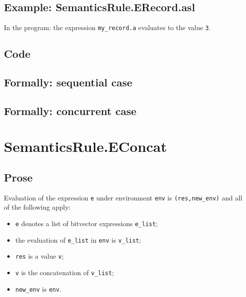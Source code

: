 \documentclass{book}
\begin{document}
  \subsection{Example: SemanticsRule.ERecord.asl}
    In the program:
    the expression \texttt{my\_record.a} evaluates to the value \texttt{3}.

  \subsection{Code}

\begin{emptyformal}
  \subsection{Formally: sequential case}

  \subsection{Formally: concurrent case}
\end{emptyformal}



\section{SemanticsRule.EConcat \label{sec:SemanticsRule.EConcat}}

  \subsection{Prose}
  Evaluation of the expression \texttt{e} under environment \texttt{env} is
  \texttt{(res,new\_env)} and all of the following apply:
  \begin{itemize}
  \item \texttt{e} denotes a list of bitvector expressions \texttt{e\_list};
  \item the evaluation of \texttt{e\_list} in \texttt{env} is \texttt{v\_list};
  \item \texttt{res} is a value \texttt{v};
  \item \texttt{v} is the concatenation of \texttt{v\_list};
  \item \texttt{new\_env} is \texttt{env}.
  \end{itemize}
\end{document}
